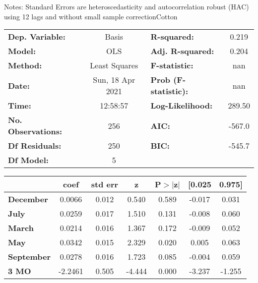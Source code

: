 Notes: \newline
 [1] Standard Errors are heteroscedasticity and autocorrelation robust (HAC) using 12 lags and without small sample correctionCotton\begin{center}
\begin{tabular}{lclc}
\toprule
\textbf{Dep. Variable:}    &      Basis       & \textbf{  R-squared:         } &     0.219   \\
\textbf{Model:}            &       OLS        & \textbf{  Adj. R-squared:    } &     0.204   \\
\textbf{Method:}           &  Least Squares   & \textbf{  F-statistic:       } &       nan   \\
\textbf{Date:}             & Sun, 18 Apr 2021 & \textbf{  Prob (F-statistic):} &      nan    \\
\textbf{Time:}             &     12:58:57     & \textbf{  Log-Likelihood:    } &    289.50   \\
\textbf{No. Observations:} &         256      & \textbf{  AIC:               } &    -567.0   \\
\textbf{Df Residuals:}     &         250      & \textbf{  BIC:               } &    -545.7   \\
\textbf{Df Model:}         &           5      & \textbf{                     } &             \\
\bottomrule
\end{tabular}
\begin{tabular}{lcccccc}
                   & \textbf{coef} & \textbf{std err} & \textbf{z} & \textbf{P$> |$z$|$} & \textbf{[0.025} & \textbf{0.975]}  \\
\midrule
\textbf{December}  &       0.0066  &        0.012     &     0.540  &         0.589        &       -0.017    &        0.031     \\
\textbf{July}      &       0.0259  &        0.017     &     1.510  &         0.131        &       -0.008    &        0.060     \\
\textbf{March}     &       0.0214  &        0.016     &     1.367  &         0.172        &       -0.009    &        0.052     \\
\textbf{May}       &       0.0342  &        0.015     &     2.329  &         0.020        &        0.005    &        0.063     \\
\textbf{September} &       0.0278  &        0.016     &     1.723  &         0.085        &       -0.004    &        0.059     \\
\textbf{3 MO}      &      -2.2461  &        0.505     &    -4.444  &         0.000        &       -3.237    &       -1.255     \\

\end{tabular}
\end{center}
